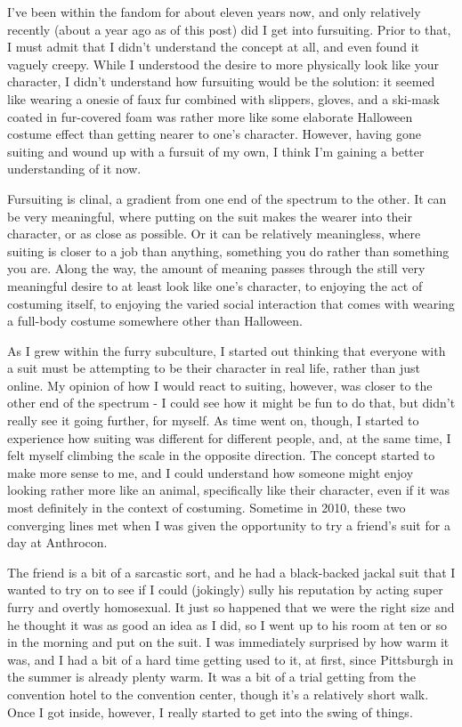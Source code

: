 
I've been within the fandom for about eleven years now, and only relatively recently (about a year ago as of this post) did I get into fursuiting. Prior to that, I must admit that I didn't understand the concept at all, and even found it vaguely creepy. While I understood the desire to more physically look like your character, I didn't understand how fursuiting would be the solution: it seemed like wearing a onesie of faux fur combined with slippers, gloves, and a ski-mask coated in fur-covered foam was rather more like some elaborate Halloween costume effect than getting nearer to one's character. However, having gone suiting and wound up with a fursuit of my own, I think I'm gaining a better understanding of it now.

Fursuiting is clinal, a gradient from one end of the spectrum to the other. It can be very meaningful, where putting on the suit makes the wearer into their character, or as close as possible. Or it can be relatively meaningless, where suiting is closer to a job than anything, something you do rather than something you are. Along the way, the amount of meaning passes through the still very meaningful desire to at least look like one's character, to enjoying the act of costuming itself, to enjoying the varied social interaction that comes with wearing a full-body costume somewhere other than Halloween.

As I grew within the furry subculture, I started out thinking that everyone with a suit must be attempting to be their character in real life, rather than just online. My opinion of how I would react to suiting, however, was closer to the other end of the spectrum - I could see how it might be fun to do that, but didn't really see it going further, for myself. As time went on, though, I started to experience how suiting was different for different people, and, at the same time, I felt myself climbing the scale in the opposite direction. The concept started to make more sense to me, and I could understand how someone might enjoy looking rather more like an animal, specifically like their character, even if it was most definitely in the context of costuming. Sometime in 2010, these two converging lines met when I was given the opportunity to try a friend's suit for a day at Anthrocon.

The friend is a bit of a sarcastic sort, and he had a black-backed jackal suit that I wanted to try on to see if I could (jokingly) sully his reputation by acting super furry and overtly homosexual. It just so happened that we were the right size and he thought it was as good an idea as I did, so I went up to his room at ten or so in the morning and put on the suit. I was immediately surprised by how warm it was, and I had a bit of a hard time getting used to it, at first, since Pittsburgh in the summer is already plenty warm. It was a bit of a trial getting from the convention hotel to the convention center, though it's a relatively short walk. Once I got inside, however, I really started to get into the swing of things.

